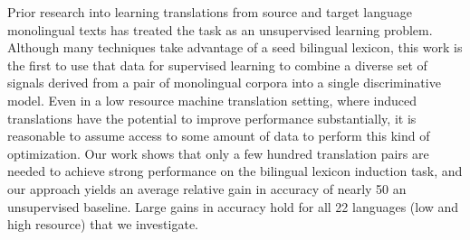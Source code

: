 Prior research into learning translations from source and target language monolingual texts has treated the task as an unsupervised learning problem.
 Although many techniques take advantage of a seed bilingual lexicon, this work
 is the first to use that data for supervised learning to combine a diverse set
 of signals derived from a pair of monolingual corpora into a single
 discriminative model. Even in a low resource machine translation setting, where
 induced translations have the potential to improve performance substantially,
 it is reasonable to assume access to some amount of data to perform this kind
 of optimization. Our work shows that only a few hundred translation pairs are
 needed to achieve strong performance on the bilingual lexicon induction task,
 and our approach yields an average relative gain in accuracy of nearly 50%
 an unsupervised baseline. Large gains in accuracy hold for all 22 languages
 (low and high resource) that we investigate.

